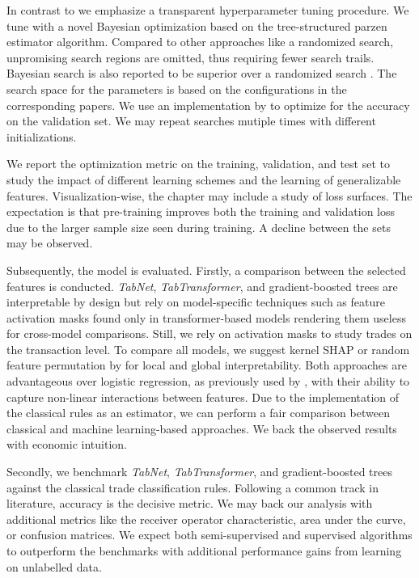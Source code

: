 In contrast to \textcite{ronenMachineLearningTrade2022} we emphasize a transparent hyperparameter tuning procedure. We tune with a novel Bayesian optimization based on the tree-structured parzen estimator algorithm. Compared to other approaches like a randomized search, unpromising search regions are omitted, thus requiring fewer search trails. Bayesian search is also reported to be superior over a randomized search \autocite{turnerBayesianOptimizationSuperior2021}. The search space for the parameters is based on the configurations in the corresponding papers. We use an implementation by \textcite{akibaOptunaNextgenerationHyperparameter2019} to optimize for the accuracy on the validation set. We may repeat searches mutiple times with different initializations.

We report the optimization metric on the training, validation, and test set to study the impact of different learning schemes and the learning of generalizable features. Visualization-wise, the chapter may include a study of loss surfaces. The expectation is that pre-training improves both the training and validation loss due to the larger sample size seen during training. A decline between the sets may be observed.

Subsequently, the model is evaluated. Firstly, a comparison between the selected features is conducted. \textit{TabNet}, \textit{TabTransformer}, and gradient-boosted trees are interpretable by design but rely on model-specific techniques such as feature activation masks found only in transformer-based models rendering them useless for cross-model comparisons. Still, we rely on activation masks to study trades on the transaction level. To compare all models, we suggest kernel \gls{SHAP} \autocite{lundbergUnifiedApproachInterpreting2017} or random feature permutation by \textcite{breimanRandomForests2001} for local and global interpretability. Both approaches are advantageous over logistic regression, as previously used by \textcites{savickasInferringDirectionOption2003}{chakrabartyTradeClassificationAlgorithms2012}, with their ability to capture non-linear interactions between features. Due to the implementation of the classical rules as an estimator, we can perform a fair comparison between classical and machine learning-based approaches. We back the observed results with economic intuition.

Secondly, we benchmark \textit{TabNet}, \textit{TabTransformer}, and gradient-boosted trees against the classical trade classification rules. Following a common track in literature, accuracy is the decisive metric. We may back our analysis with additional metrics like the receiver operator characteristic, area under the curve, or confusion matrices. We expect both semi-supervised and supervised algorithms to outperform the benchmarks with additional performance gains from learning on unlabelled data.


